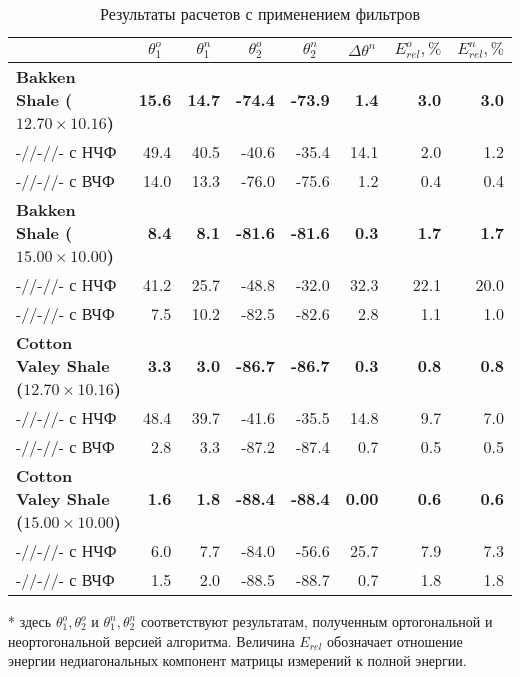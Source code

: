 \documentclass[a4paper,11pt]{article}
\begin{document}
\begin{table}[h]
\footnotesize
\centering
\caption{Результаты расчетов с применением фильтров}
\renewcommand{\arraystretch}{1.5}
\begin{tabularx}{\textwidth}{|X|rr|rr|r|rr|}
\hline
				&\multicolumn{1}{c}{$\theta_1^o$} & \multicolumn{1}{c|}{$\theta_1^n$} & \multicolumn{1}{c}{$\theta_2^o$} & \multicolumn{1}{c|}{$\theta_2^n$} & \multicolumn{1}{c|}{$\Delta\theta^n$}& \multicolumn{1}{c}{$E_{rel}^o, \%$} & \multicolumn{1}{c|}{$E_{rel}^n, \%$} \\ \hline
\hline	\textbf{Bakken Shale ($12.70 \times 10.16$)} & \textbf{15.6} & \textbf{14.7} & \textbf{-74.4}  & \textbf{-73.9}  & \textbf{1.4}  & \textbf{3.0} & \textbf{3.0} \\
		-//-//- с НЧФ & 49.4 & 40.5 & -40.6 & -35.4  & 14.1 & 2.0 & 1.2\\
		-//-//- с ВЧФ & 14.0 & 13.3 & -76.0 & -75.6  & 1.2 & 0.4 & 0.4\\
\hline	\textbf{Bakken Shale ($15.00 \times 10.00$)} & \textbf{8.4} & \textbf{8.1} & \textbf{-81.6}  & \textbf{-81.6} & \textbf{0.3}  & \textbf{1.7} & \textbf{1.7} \\
		-//-//- с НЧФ & 41.2 & 25.7 & -48.8 & -32.0  & 32.3 & 22.1 & 20.0\\
		-//-//- с ВЧФ & 7.5 & 10.2 & -82.5 & -82.6  & 2.8 & 1.1 & 1.0\\
\hline	\textbf{Cotton Valey Shale ($12.70 \times 10.16$)} & \textbf{3.3} & \textbf{3.0} & \textbf{-86.7}  & \textbf{-86.7}  & \textbf{0.3}  & \textbf{0.8} & \textbf{0.8}\\
		-//-//- с НЧФ & 48.4 & 39.7 & -41.6 & -35.5  & 14.8  & 9.7 & 7.0 \\
		-//-//- с ВЧФ & 2.8 & 3.3 & -87.2 & -87.4  & 0.7  & 0.5 & 0.5\\	
\hline	\textbf{Cotton Valey Shale ($15.00 \times 10.00$)} & \textbf{1.6} & \textbf{1.8} & \textbf{-88.4}  & \textbf{-88.4}  & \textbf{0.00}  & \textbf{0.6} & \textbf{0.6} \\
		-//-//- с НЧФ & 6.0 & 7.7 & -84.0 & -56.6  & 25.7  & 7.9 & 7.3 \\
		-//-//- с ВЧФ & 1.5 & 2.0 & -88.5 & -88.7  & 0.7  & 1.8 & 1.8\\		
\hline	
\end{tabularx} 
\begin{flushleft}
* здесь $\theta_1^o,\theta_2^o$ и $\theta_1^n,\theta_2^n$ соответствуют результатам, полученным ортогональной и неортогональной версией алгоритма. Величина $E_{rel}$ обозначает отношение энергии недиагональных компонент матрицы измерений к полной энергии.
\end{flushleft}
\label{tab:filter_process_results}
\renewcommand{\arraystretch}{1.0}
\end{table}
\end{document}
